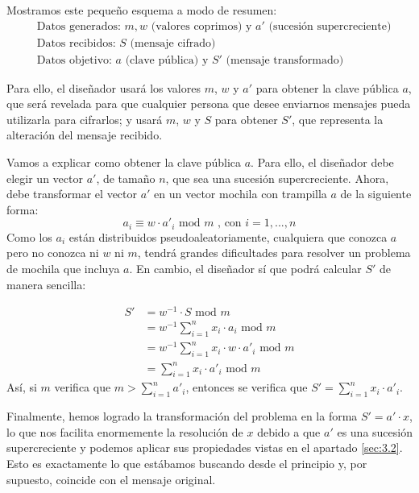     Mostramos este pequeño esquema a modo de resumen:
    \begin{align}
        &\text{Datos generados: } m, w \text{ (valores coprimos) y } a' \text{ (sucesión supercreciente)}\\
        &\text{Datos recibidos: } S \text{ (mensaje cifrado)}\\
        &\text{Datos objetivo: } a \text{ (clave pública) y } S' \text{ (mensaje transformado)}
    \end{align}
    
    Para ello, el diseñador usará los valores $m$, $w$ y $a'$ para obtener la clave pública $a$, que será revelada para que cualquier persona que desee enviarnos mensajes pueda utilizarla para cifrarlos; y usará $m$, $w$ y $S$ para obtener $S'$, que representa la alteración del mensaje recibido.
    
    Vamos a explicar como obtener la clave pública $a$. Para ello, el diseñador debe elegir un vector $a'$, de tamaño $n$, que sea una sucesión supercreciente. Ahora, debe transformar el vector $a'$ en un vector mochila con trampilla $a$ de la siguiente forma:
    \begin{equation}
        a_{i} \equiv w \cdot a'_{i} \text{ mod } m \text{ , con } i = 1, ... , n
    \end{equation}
    Como los $a_{i}$ están distribuidos pseudoaleatoriamente, cualquiera que conozca $a$ pero no conozca ni $w$ ni $m$, tendrá grandes dificultades para resolver un problema de mochila que incluya $a$. En cambio, el diseñador sí que podrá calcular $S'$ de manera sencilla:
    
    \begin{align}    
        S' &= w^{-1} \cdot S \text{ mod } m \\
           &= w^{-1} \sum_{i=1}^{n} x_{i} \cdot a_{i}  \text{ mod } m \\
           &= w^{-1} \sum_{i=1}^{n} x_{i} \cdot w \cdot a'_{i}  \text{ mod } m \\
           &= \sum_{i=1}^{n} x_{i} \cdot a'_{i}  \text{ mod } m
    \end{align}
    Así, si $m$ verifica que $m > \sum_{i=1}^{n} a'_{i}$, entonces se verifica que $S' = \sum_{i=1}^{n} x_{i} \cdot a'_{i}$.
    
    Finalmente, hemos logrado la transformación del problema en la forma $S' = a' \cdot x$, lo que nos facilita enormemente la resolución de $x$ debido a que $a'$ es una sucesión supercreciente y podemos aplicar sus propiedades vistas en el apartado \ref{sec:3.2}. Esto es exactamente lo que estábamos buscando desde el principio y, por supuesto, coincide con el mensaje original. 

